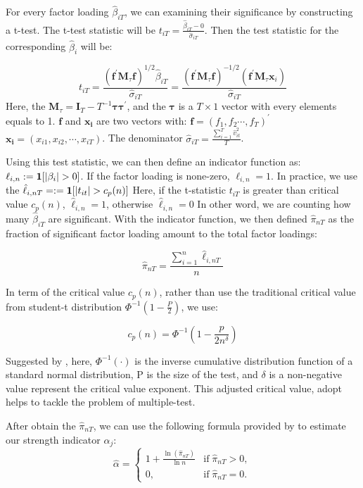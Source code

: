 For every factor loading $\hat{\beta}_{iT}$, we can examining their significance by constructing a t-test.
The t-test statistic will be $t_{iT} = \frac{\hat{\beta}_{iT} - 0}{\hat{\sigma}_{iT}}$.  
Then the test statistic for the corresponding $\hat{\beta}_i$ will be:

\[t_{i T}=\frac{\left(\mathbf{f}^{\prime} \mathbf{M}_{\tau} \mathbf{f}\right)^{1 / 2} \hat{\beta}_{i T}}{\hat{\sigma}_{i T}}=\frac{\left(\mathbf{f}^{\prime} \mathbf{M}_{\tau} \mathbf{f}\right)^{-1 / 2}\left(\mathbf{f}^{\prime} \mathbf{M}_{\tau} \mathbf{x}_{i}\right)}{\hat{\sigma}_{i T}} \tag{3} \label{test_statistic} \]
Here, the $\mathbf{M}_{\tau} = \mathbf{I}_T - T^{-1}\mathbf{\tau}\mathbf{\tau^\prime}$, and the $\mathbf{\tau}$ is a $T\times 1$ vector with every elements equals to 1.
$\mathbf{f}$ and $\mathbf{x_i}$ are two vectors with: $\mathbf{f} = (f_1, f_2 \cdots, f_T)^{\prime}$   $\mathbf{x_i} = (x_{i1}, x_{i2}, \cdots, x_{iT})$.
The denominator $\hat{\sigma}_{iT} = \frac{\sum_{i=1}^{T} \hat{v}^2_{it} }{T}$.

Using this test statistic, we can then define an indicator function as: $\ell_{i,n} := {\bf1}[|\beta_i|>0]$.
If the factor loading is none-zero, $\ell_{i,n} = 1$.
In practice, we use the $\hat{\ell}_{i,nT} = := {\bf1}[|t_{it}|>c_p(n)]$
Here, if the t-statistic $t_{iT}$ is greater than critical value $c_p(n)$,  $\hat{\ell}_{i,n} = 1$, otherwise $\hat{\ell}_{i,n} = 0$
In other word, we are counting how many $\hat{\beta}_{iT}$ are significant.
With the indicator function, we then defined $\hat{\pi}_{nT}$ as the fraction of significant factor loading amount to the total factor loadings:

\[  \hat{\pi}_{nT} = \frac{\sum_{i=1}^n \hat{\ell}_{i,nT}}{n} \tag{4} \label{pi_function} \]


In term of the critical value $c_p(n)$, rather than use the traditional critical value from student-t distribution $\Phi^{-1}(1-\frac{P}{2})$, we use:

\[   c_p(n) = \Phi^{-1}(1 - \frac{p}{2n^\delta})   \tag{5} \label{critical_value_function} \]

Suggested by , here, $\Phi^{-1}(\cdot)$ is the inverse cumulative distribution function of a standard normal distribution, P is the size of the test, and $\delta$ is a non-negative value represent the critical value exponent. 
This adjusted critical value, adopt helps to tackle the problem of multiple-test.

After obtain the $\hat{\pi}_{nT}$, we can use the following formula provided by  to estimate our strength indicator $\alpha_j$:
\[ \hat{\alpha} = \begin{cases}
1+\frac{\ln(\hat{\pi}_{nT})}{\ln n} & \text{if}\; \hat{\pi}_{nT} > 0,\\
0, & \text{if}\; \hat{\pi}_{nT} = 0.
	\end{cases} \tag{6} \label{estimation_method} \]

